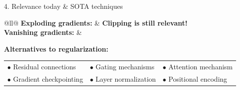 \begin{frame}[t]
\begin{columns}[t,totalwidth=\textwidth]
\begin{column}{0.33\textwidth}
    \begin{block}{4. Relevance today \& SOTA techniques}

 
        
            \begin{tabular}{@{}ll@{}}
                \textbf{Exploding gradients:} & \textbf{Clipping is still relevant!} \\
                \textbf{Vanishing gradients:} & 
                    \begin{minipage}[t]{0.8\textwidth} 
                        \textbf{Alternatives to regularization:}\\[0.3em]
                        \begin{tabular}{@{}lll@{}}
                        $\bullet$ Residual connections     & $\bullet$ Gating mechanisms       & $\bullet$ Attention mechanism \\
                        $\bullet$ Gradient checkpointing   & $\bullet$ Layer normalization     & $\bullet$ Positional encoding \\
                        \end{tabular}
                    \end{minipage} \\
                \end{tabular}
                
    
                


\end{block}
\end{column}
\end{columns}
\end{frame}

